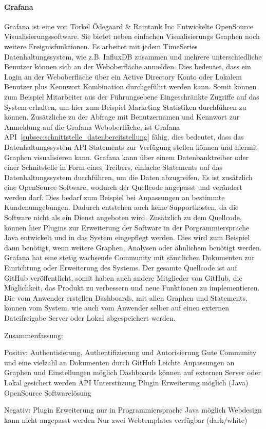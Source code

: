 \paragraph{Grafana}
\label{paragraph:grafana}
Grafana ist eine von Torkel Ödegaard \& Raintank Inc Entwickelte OpenSource
Visualisierungssoftware. Sie bietet neben einfachen Visualisierungs Graphen
noch weitere Ereignisfunktionen. Es arbeitet mit jedem TimeSeries
Datenhaltungssystem, wie z.B. InfluxDB zusammen und mehrere unterschiedliche
Benutzer können sich an der Weboberfläche anmelden. Dies bedeutet, dass ein
Login an der Weboberfläche über ein \gls{Active Directory} Konto oder Lokalem
Benutzer plus Kennwort Kombination durchgeführt werden kann. Somit können zum
Beispiel Mitarbeiter aus der Führungsebene Eingeschränkte Zugriffe auf das
System erhalten, um hier zum Beispiel Marketing Statistiken durchführen zu
können. Zusätzliche zu der Abfrage mit Benutzernamen und Kennwort zur Anmeldung
auf die Grafana Weboberfläche, ist Grafana
API~\ref{subsec:schnittstelle_datenbereitstellung} fähig, dies bedeutet, dass
das Datenhaltungssystem API Statements zur Verfügung stellen können und hiermit
Graphen visualisieren kann. Grafana kann über einem \gls{Datenbanktreiber}
oder einer Schnitstelle in Form eines Treibers, einfache Statements auf das
Datenhaltungssystem durchführen, um die Daten abzugreifen. Es ist zusätzlich
eine OpenSource Software, wodurch der Quellcode angepasst und verändert werden
darf. Dies bedarf zum Beispiel bei Anpassungen an bestimmte Kundenumgebungen.
Dadurch entstehen auch keine Supportkosten, da die Software nicht als ein
Dienst angeboten wird. Zusätzlich zu dem Quellcode, können hier Plugins zur
Erweiterung der Software in der Porgrammiersprache Java entwickelt und in das
System eingepflegt werden. Dies wird zum Beispiel dann benötigt, wenn weitere
Graphen, Analysen oder ähnlichem benötigt werden.  Grafana hat eine stetig
wachsende Community mit sämtlichen Dokumenten zur Einrichtung oder Erweiterung
des Systems. Der gesamte Quellcode ist auf GitHub veröffentlicht, somit haben
auch andere Mitglieder von GitHub, die Möglichkeit, das Produkt zu verbessern
und neue Funktionen zu implementieren. Die vom Anwender erstellen Dashboards,
mit allen Graphen und Statements, können vom System, wie auch vom Anwender
selber auf einen externen Dateifreigabe Server oder Lokal abgespeichert werden.

Zusammenfassung:

\begin{outline}
  Positiv:
  \1 Authentisierung, Authentifizierung und Autorisierung
  \1 Gute Community und eine vielzahl an Dokumenten durch GitHub
  \1 Leichte Anpassungen an Graphen und Einstellungen möglich
  \1 Dashboards können auf externen Server oder Lokal gesichert werden
  \1 API Unterstüzung
  \1 Plugin Erweiterung möglich (Java)
  \1 OpenSource Softwarelösung

  Negativ:
  \1 Plugin Erweiterung nur in Programmiersprache Java möglich
  \1 Webdesign kann nicht angepasst werden
  \1 Nur zwei Webtemplates verfügbar (dark/white)
\end{outline}

